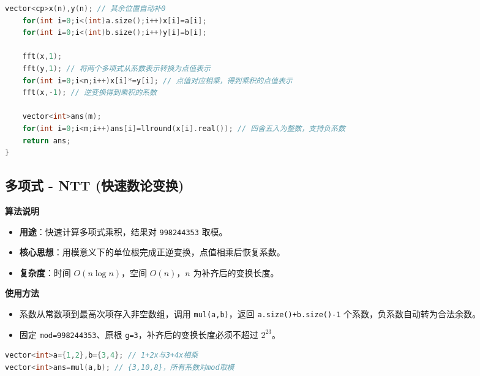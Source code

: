 \documentclass[10pt,landscape,a4paper]{article}
\begin{document}
\begin{multicols*}{3}
\begin{lstlisting}[language=C++]
    vector<cp>x(n),y(n); // 其余位置自动补0
    for(int i=0;i<(int)a.size();i++)x[i]=a[i];
    for(int i=0;i<(int)b.size();i++)y[i]=b[i];

    fft(x,1);
    fft(y,1); // 将两个多项式从系数表示转换为点值表示
    for(int i=0;i<n;i++)x[i]*=y[i]; // 点值对应相乘，得到乘积的点值表示
    fft(x,-1); // 逆变换得到乘积的系数

    vector<int>ans(m);
    for(int i=0;i<m;i++)ans[i]=llround(x[i].real()); // 四舍五入为整数，支持负系数
    return ans;
}
\end{lstlisting}
\subsection*{多项式 - NTT (快速数论变换)}
\par\addvspace{0.7ex}\noindent\textbf{算法说明}\par\nobreak
\begin{itemize}
\item \textbf{用途}：快速计算多项式乘积，结果对 \texttt{9\allowbreak{}9\allowbreak{}8\allowbreak{}2\allowbreak{}4\allowbreak{}4\allowbreak{}3\allowbreak{}5\allowbreak{}3} 取模。
\item \textbf{核心思想}：用模意义下的单位根完成正逆变换，点值相乘后恢复系数。
\item \textbf{复杂度}：时间 $O(n\log n)$，空间 $O(n)$，$n$ 为补齐后的变换长度。
\end{itemize}
\par\addvspace{0.7ex}\noindent\textbf{使用方法}\par\nobreak
\begin{itemize}
\item 系数从常数项到最高次项存入非空数组，调用 \texttt{m\allowbreak{}u\allowbreak{}l\allowbreak{}(\allowbreak{}a\allowbreak{},\allowbreak{}b\allowbreak{})}，返回 \texttt{a\allowbreak{}.\allowbreak{}s\allowbreak{}i\allowbreak{}z\allowbreak{}e\allowbreak{}(\allowbreak{})\allowbreak{}+\allowbreak{}b\allowbreak{}.\allowbreak{}s\allowbreak{}i\allowbreak{}z\allowbreak{}e\allowbreak{}(\allowbreak{})\allowbreak{}-\allowbreak{}1} 个系数，负系数自动转为合法余数。
\item 固定 \texttt{m\allowbreak{}o\allowbreak{}d\allowbreak{}=\allowbreak{}9\allowbreak{}9\allowbreak{}8\allowbreak{}2\allowbreak{}4\allowbreak{}4\allowbreak{}3\allowbreak{}5\allowbreak{}3}、原根 \texttt{g\allowbreak{}=\allowbreak{}3}，补齐后的变换长度必须不超过 $2^{23}$。
\end{itemize}
\begin{lstlisting}[language=C++,numbers=none,basicstyle=\footnotesize\ttfamily]
vector<int>a={1,2},b={3,4}; // 1+2x与3+4x相乘
vector<int>ans=mul(a,b); // {3,10,8}，所有系数对mod取模
\end{lstlisting}


\end{multicols*}
\end{document}
